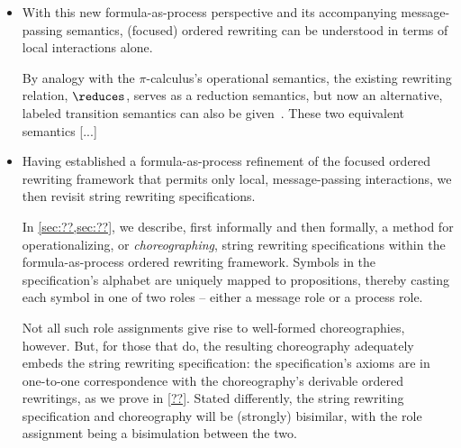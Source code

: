 \begin{itemize}[listparindent=\parindent, itemsep=\dimexpr\itemsep+\parsep\relax, parsep=0pt]
\item
  With this new formula-as-process perspective and its accompanying mes\-sage-passing semantics, (focused) ordered rewriting can be understood in terms of local interactions alone.

  By analogy with the $\pi$-calculus's operational semantics, the existing rewriting relation, $\reduces$, serves as a reduction semantics, but now an alternative, labeled transition semantics can also be given~.
  These two equivalent semantics [...]

\item
  Having established a formula-as-process refinement of the focused ordered rewriting framework that permits only local, message-passing interactions, we then revisit string rewriting specifications.

  In \cref{sec:??,sec:??}, we describe, first informally and then formally, a method for operationalizing, or \emph{choreographing}, string rewriting specifications within the formula-as-process ordered rewriting framework.
  Symbols in the specification's alphabet are uniquely mapped to propositions, thereby casting each symbol in one of two roles -- either a message role or a process role.

  Not all such role assignments give rise to well-formed choreographies, however.
  But, for those that do, the resulting choreography adequately embeds the string rewriting specification:
  the specification's axioms are in one-to-one correspondence with the choreography's derivable ordered rewritings, as we prove in \cref{??}.
  Stated differently, the string rewriting specification and choreography will be (strongly) bisimilar, with the role assignment being a bisimulation between the two.








\end{itemize}

